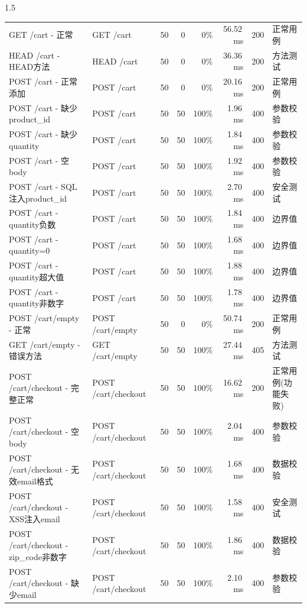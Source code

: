\documentclass[a4paper,12pt]{report}
\begin{document}
\begin{spacing}{1.5}
\begin{appendices}
\begin{table}[htbp]
{\begin{tabular}{llrrrrrl}
				GET /cart - 正常 & GET /cart & 50 & 0 & 0\% & 56.52\,ms & 200 & 正常用例 \\
				HEAD /cart - HEAD方法 & HEAD /cart & 50 & 0 & 0\% & 36.36\,ms & 200 & 方法测试 \\
				POST /cart - 正常添加 & POST /cart & 50 & 0 & 0\% & 20.16\,ms & 200 & 正常用例 \\
				POST /cart - 缺少product\_id & POST /cart & 50 & 50 & 100\% & 1.96\,ms & 400 & 参数校验 \\
				POST /cart - 缺少quantity & POST /cart & 50 & 50 & 100\% & 1.84\,ms & 400 & 参数校验 \\
				POST /cart - 空body & POST /cart & 50 & 50 & 100\% & 1.92\,ms & 400 & 参数校验 \\
				POST /cart - SQL注入product\_id & POST /cart & 50 & 50 & 100\% & 2.70\,ms & 400 & 安全测试 \\
				POST /cart - quantity负数 & POST /cart & 50 & 50 & 100\% & 1.84\,ms & 400 & 边界值 \\
				POST /cart - quantity=0 & POST /cart & 50 & 50 & 100\% & 1.68\,ms & 400 & 边界值 \\
				POST /cart - quantity超大值 & POST /cart & 50 & 50 & 100\% & 1.88\,ms & 400 & 边界值 \\
				POST /cart - quantity非数字 & POST /cart & 50 & 50 & 100\% & 1.78\,ms & 400 & 边界值 \\
				POST /cart/empty - 正常 & POST /cart/empty & 50 & 0 & 0\% & 50.74\,ms & 200 & 正常用例 \\
				GET /cart/empty - 错误方法 & GET /cart/empty & 50 & 50 & 100\% & 27.44\,ms & 405 & 方法测试 \\
				POST /cart/checkout - 完整正常 & POST /cart/checkout & 50 & 50 & 100\% & 16.62\,ms & 200 & 正常用例(功能失败) \\
				POST /cart/checkout - 空body & POST /cart/checkout & 50 & 50 & 100\% & 2.04\,ms & 400 & 参数校验 \\
				POST /cart/checkout - 无效email格式 & POST /cart/checkout & 50 & 50 & 100\% & 1.68\,ms & 400 & 数据校验 \\
				POST /cart/checkout - XSS注入email & POST /cart/checkout & 50 & 50 & 100\% & 1.58\,ms & 400 & 安全测试 \\
				POST /cart/checkout - zip\_code非数字 & POST /cart/checkout & 50 & 50 & 100\% & 1.86\,ms & 400 & 数据校验 \\
				POST /cart/checkout - 缺少email & POST /cart/checkout & 50 & 50 & 100\% & 2.10\,ms & 400 & 参数校验 \\

\end{tabular}}
\end{table}
\end{appendices}
\end{spacing}
\end{document}
